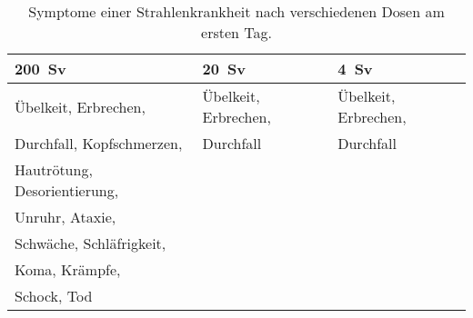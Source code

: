\begin{table}
	\caption{Symptome einer Strahlenkrankheit nach verschiedenen Dosen am ersten Tag.\cite{AnnuRev18_2}}
	\begin{tabular}{lll}
		\toprule
 		\SI{200}{\sievert} & \SI{20}{\sievert}& \SI{4}{\sievert}\\
		\midrule
 			 Übelkeit, Erbrechen, 				& Übelkeit, Erbrechen,& Übelkeit, Erbrechen,\\
		 	 Durchfall,  Kopfschmerzen, 	& Durchfall  					& Durchfall						\\
		 	 Hautrötung, Desorientierung,	&\phantom{Hautrötung, Desorientierung,} 										&											\\
		 	 Unruhr, Ataxie,							& 										&\phantom{Hautrötung, Desorientierung,}  										\\
		 	 Schwäche, Schläfrigkeit, 		&  										&  										\\
			 Koma, Krämpfe,								&											&											\\
			 Schock, Tod									&											&											\\
	\end{tabular}
\end{table}
